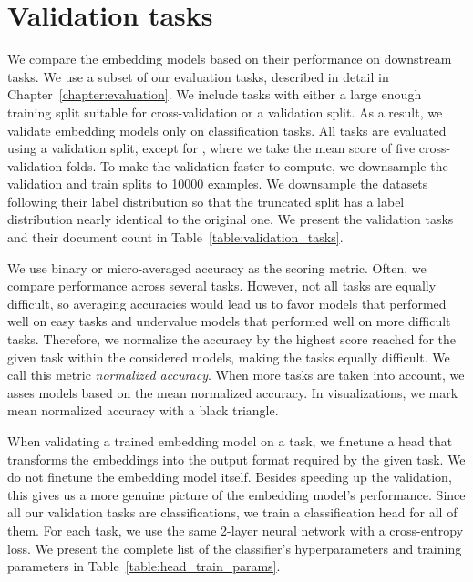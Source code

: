 \section{Validation tasks}\label{section:validation_tasks}

We compare the embedding models based on their performance on downstream tasks.
We use a subset of our evaluation tasks, described in detail in
Chapter~\ref{chapter:evaluation}. We include tasks with either a large enough
training split suitable for cross-validation or a validation split. As a result, we validate embedding models only on classification tasks. All tasks are
evaluated using a validation split, except for , where we take the
mean score of five cross-validation folds. To make the validation faster to
compute, we downsample the validation and train splits to 10000 examples. We
downsample the datasets following their label distribution so that the
truncated split has a label distribution nearly identical to the original one.
We present the validation tasks and their document count in
Table~\ref{table:validation_tasks}.

We use binary or micro-averaged accuracy as the scoring metric. Often, we compare
performance across several tasks. However, not all tasks are equally difficult,
so averaging accuracies would lead us to favor models that performed well on
easy tasks and undervalue models that performed well on more difficult tasks.
Therefore, we normalize the accuracy by the highest score reached for the given
task within the considered models, making the tasks equally difficult. We call
this metric \emph{normalized accuracy}. When more tasks are taken into account,
we asses models based on the mean normalized accuracy. In visualizations, we
mark mean normalized accuracy with a black triangle.

When validating a trained embedding model on a task, we finetune a head that
transforms the embeddings into the output format required by the given task. We
do not finetune the embedding model itself. Besides speeding up the validation,
this gives us a more genuine picture of the embedding model's performance.
Since all our validation tasks are classifications, we train a classification head for all of them. For each task, we use the same 2-layer neural network with a cross-entropy loss. We present the complete
list of the classifier's hyperparameters and training parameters in
Table~\ref{table:head_train_params}.

